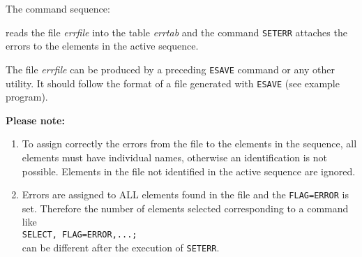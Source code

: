 The command sequence: 

reads the file \textit{errfile} into the table \textit{errtab} and the
command \texttt{SETERR} attaches the errors to the elements in the active
sequence.  

The file \textit{errfile} can be produced by a preceding \texttt{ESAVE} command
or any other utility. It should follow the format of a file generated
with \texttt{ESAVE} (see example program). 

\textbf{Please note:}
\begin{enumerate}
   \item To assign correctly the errors from the file to the elements in
     the sequence, all elements must have individual names, otherwise an
     identification is not possible. Elements in the file not identified
     in the active sequence are ignored.  
   \item Errors are assigned to ALL elements found in the file and the
     \texttt{FLAG=ERROR} is set. Therefore the number of elements selected
     corresponding to a command like
     \\ \texttt{SELECT, FLAG=ERROR,...;}
     \\ can be different after the execution of \texttt{SETERR}. 
\end{enumerate}


